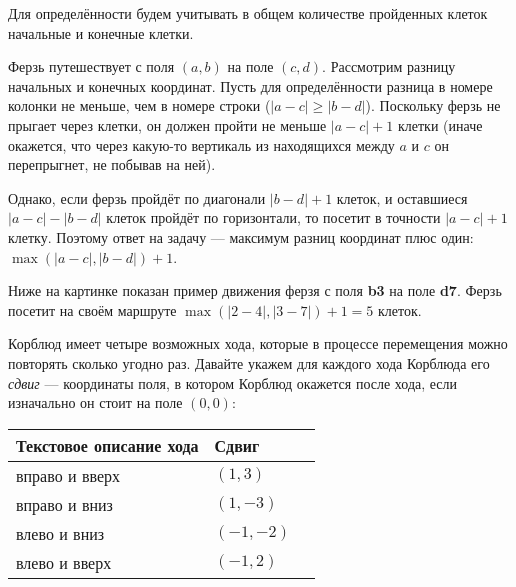 \begin{itemize}
\itA Для определённости будем учитывать в общем количестве пройденных клеток начальные и конечные клетки.

Ферзь путешествует с поля $(a,b)$ на поле $(c,d)$. Рассмотрим разницу начальных и конечных координат. 
Пусть для определённости разница в номере колонки не меньше, чем в номере строки ($|a-c| \ge |b-d|$).
Поскольку ферзь не прыгает через клетки, он должен пройти не меньше $|a-c|+1$ клетки (иначе окажется,
что через какую-то вертикаль из находящихся между $a$ и $c$ он перепрыгнет, не побывав на ней).

Однако, если ферзь пройдёт по диагонали $|b-d|+1$ клеток, и оставшиеся $|a-c|-|b-d|$ клеток пройдёт
по горизонтали, то посетит в точности $|a-c|+1$ клетку. 
Поэтому ответ на задачу --- максимум разниц координат плюс один: $\max(|a-c|,|b-d|)+1$.

Ниже на картинке показан пример движения ферзя с поля {\bfseries b3} на поле {\bfseries d7}. 
Ферзь посетит на своём маршруте $\max(|2-4|,|3-7|)+1 = 5$ клеток.

\begin{center}\end{center}

\itB Корблюд имеет четыре возможных хода, которые в процессе перемещения можно повторять сколько угодно
раз. Давайте укажем для каждого хода Корблюда его \emph{сдвиг} --- координаты поля, в котором 
Корблюд окажется после хода, если изначально он стоит на поле $(0,0)$:

\begin{center}\begin{tabular}{lll}
Текстовое описание хода & Сдвиг\\
\hline                       
вправо и вверх & $(1,3)$  \\
вправо и вниз & $(1,-3)$  \\
влево и вниз & $(-1,-2)$  \\
влево и вверх & $(-1,2)$  \\
\end{tabular}\end{center}


\end{itemize}
